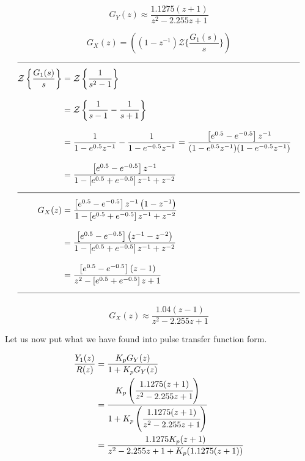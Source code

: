 \documentclass[a4paper,12pt]{article}
\begin{document}
\begin{enumerate}
\begin{enumerate}
				$$\boxed  { G_Y(z)\approx \frac{1.1275(z+1)}{z^2-2.255z+1} }$$
				
				
			\newpage
			
			$$ \boxed  { G_X(z)=\left((1-z^{-1}) \mathcal{Z}\{ \frac{G_1(s)}{s} \}\right) }$$  
			\begin{equation*}
				\begin{split}\\[-0.3cm]  \hline \\[-0.3cm] 
					\mathcal{Z}\left\{ \frac{G_1(s)}{s} \right\}&=\mathcal{Z}\left\{ \frac{1}{s^2-1} \right\} \\[0.3cm]
					&= \mathcal{Z} \left\{ \frac{1}{s-1}-\frac{1}{s+1} \right\} \\[0.3cm]
					&= \frac{1}{1-e^{0.5}z^{-1}} - \frac{1}{1-e^{-0.5}z^{-1}}  =  \frac{\left[e^{0.5}-e^{-0.5}\right] z^{-1}}{(1-e^{0.5}z^{-1})(1-e^{-0.5}z^{-1})} \\[0.3cm]
					&=  \frac{\left[e^{0.5}-e^{-0.5}\right] z^{-1}}{1-\left[ e^{0.5}+e^{-0.5} \right]z^{-1}+z^{-2} }   
					\\[0.3cm]  \hline \\[-0.3cm]
					G_X(z)&= \frac{\left[e^{0.5}-e^{-0.5}\right] z^{-1} \left(1-z^{-1} \right) }{1-\left[ e^{0.5}+e^{-0.5} \right]z^{-1}+z^{-2} }   \\[0.3cm]
					&= \frac{\left[e^{0.5}-e^{-0.5}\right]  \left(z^{-1}-z^{-2} \right) }{1-\left[ e^{0.5}+e^{-0.5} \right]z^{-1}+z^{-2} } \\[0.3cm]
					&= \frac{\left[e^{0.5}-e^{-0.5}\right]  \left(z-1 \right) }{z^2-\left[ e^{0.5}+e^{-0.5} \right]z+1 }
					\\[0.3cm]  \hline \\[-0.3cm]
			 	\end{split} 
			\end{equation*}
			
				$$\boxed  { G_X(z)\approx \frac{1.04  \left(z-1 \right) }{z^2-2.255z+1 } }$$
				
			\newpage
			
			Let us now put what we have found into pulse transfer function form.
				
			\begin{equation*}
				\begin{split}	
					 \frac{Y_1(z)}{R(z)} &= \frac{K_p G_Y(z)}{1+K_pG_Y(z)} \\
					 & = \cfrac{K_p \left(\cfrac{1.1275(z+1)}{z^2-2.255z+1}\right)}{1+K_p\left(\cfrac{1.1275(z+1)}{z^2-2.255z+1}\right)} \\
					 & = { \frac{1.1275K_p(z+1)}{z^2-2.255z+1+K_p(1.1275(z+1))} }
				\end{split}
			\end{equation*} 
			

\end{enumerate}
\end{enumerate}
\end{document}
